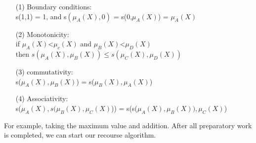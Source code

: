 \begin{itemize}
    \item [(1)]
    Boundary conditions:\\
    s(1,1) = 1, and s$(\mu_A(X),0)$ = s(0,$\mu_A(X)$) = $\mu_A(X)$
    \item [(2)]
    Monotonicity:\\
    if $\mu_A(X)$<$\mu_c(X)$ and $\mu_B(X)$<$\mu_D(X)$\\
    then $s(\mu_A(X), \mu_B(X)) \leq s(\mu_C(X), \mu_D(X))$
    \item [(3)]
    commutativity:\\
    s($\mu_A(X), \mu_B(X)$) = s($\mu_B(X), \mu_A(X)$)
    \item [(4)]
    Associativity:\\
    s($\mu_A(X), s(\mu_B(X), \mu_C(X)$)) = s(s($\mu_A(X), \mu_B(X)), \mu_C(X)$)
\end{itemize}
For example, taking the maximum value and addition. After all preparatory work is completed, we can start our recourse algorithm.



